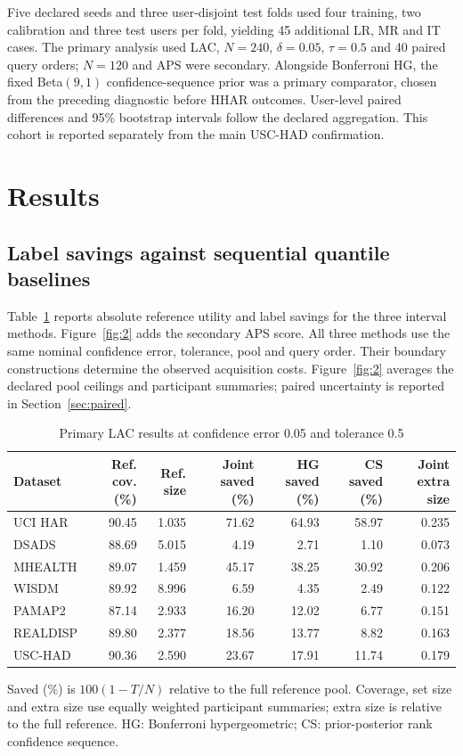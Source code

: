 \documentclass[preprint,12pt]{elsarticle}
\newcommand{\botrule}{\bottomrule}
\begin{document}
Five declared seeds and three user-disjoint test folds used four training, two calibration and three test users per fold, yielding 45 additional LR, MR and IT cases. The primary analysis used LAC, $N=240$, $\delta=0.05$, $\tau=0.5$ and 40 paired query orders; $N=120$ and APS were secondary. Alongside Bonferroni HG, the fixed Beta$(9,1)$ confidence-sequence prior was a primary comparator, chosen from the preceding diagnostic before HHAR outcomes. User-level paired differences and 95\% bootstrap intervals follow the declared aggregation. This cohort is reported separately from the main USC-HAD confirmation.

\section{Results}
\subsection{Label savings against sequential quantile baselines}
Table~\ref{tab:primary} reports absolute reference utility and label savings for the three interval methods. Figure~\ref{fig:2} adds the secondary APS score. All three methods use the same nominal confidence error, tolerance, pool and query order. Their boundary constructions determine the observed acquisition costs. Figure~\ref{fig:2} averages the declared pool ceilings and participant summaries; paired uncertainty is reported in Section~\ref{sec:paired}.

\begin{table}[!htbp]
\centering\small\setlength{\tabcolsep}{3pt}
\caption{Primary LAC results at confidence error 0.05 and tolerance 0.5}\label{tab:primary}
\begin{tabular}{lrrrrrr}
\toprule
Dataset & Ref. cov. (\%) & Ref. size & Joint saved (\%) & HG saved (\%) & CS saved (\%) & Joint extra size \\
\midrule
UCI HAR & 90.45 & 1.035 & 71.62 & 64.93 & 58.97 & 0.235 \\
DSADS & 88.69 & 5.015 & 4.19 & 2.71 & 1.10 & 0.073 \\
MHEALTH & 89.07 & 1.459 & 45.17 & 38.25 & 30.92 & 0.206 \\
WISDM & 89.92 & 8.996 & 6.59 & 4.35 & 2.49 & 0.122 \\
PAMAP2 & 87.14 & 2.933 & 16.20 & 12.02 & 6.77 & 0.151 \\
REALDISP & 89.80 & 2.377 & 18.56 & 13.77 & 8.82 & 0.163 \\
USC-HAD & 90.36 & 2.590 & 23.67 & 17.91 & 11.74 & 0.179 \\
\botrule
\end{tabular}
\begin{minipage}{\textwidth}\footnotesize Saved (\%) is $100(1-T/N)$ relative to the full reference pool. Coverage, set size and extra size use equally weighted participant summaries; extra size is relative to the full reference. HG: Bonferroni hypergeometric; CS: prior-posterior rank confidence sequence.\end{minipage}
\end{table}
\end{document}

